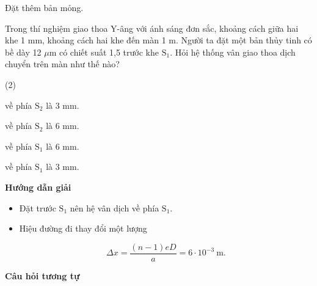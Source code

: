 \begin{dang}{Đặt thêm bản mỏng.}
	
	
	{
		Trong thí nghiệm giao thoa  Y-âng với ánh sáng đơn sắc, khoảng cách giữa hai khe 1 mm, khoảng cách hai khe đến màn 1 m. Người ta đặt một bản thủy tinh có bề dày 12 $\mu$m có chiết suất 1,5 trước khe $\text{S}_1$. Hỏi hệ thống vân giao thoa dịch chuyển trên màn như thế nào?
		\begin{mcq}(2)
			\item về phía $\text{S}_2$ là 3 mm.					
			\item về phía $\text{S}_2$  là 6 mm.
			\item về phía $\text{S}_1$ là 6 mm.					
			\item về phía $\text{S}_1$ là 3 mm.
	\end{mcq}}
	{
		\begin{center}
			\textbf{Hướng dẫn giải}
		\end{center}
		
		\begin{itemize}
			\item Đặt trước $\text{S}_1$ nên hệ vân dịch về phía $\text{S}_1$.
			\item Hiệu đường đi thay đổi một lượng 
			
			\begin{equation*}
				\Delta x =\dfrac{(n-1)eD}{a}= 6 \cdot 10^{-3}\ \text{m}.
			\end{equation*}
		\end{itemize}
		
		\begin{center}
			\textbf{Câu hỏi tương tự}
		\end{center}
		
}
\end{dang}
